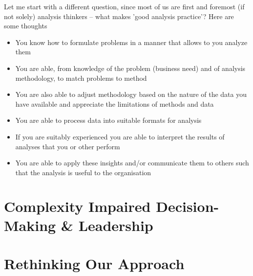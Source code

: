 
Let me start with a different question, since most of us are first and foremost (if not solely) analysis thinkers -- what makes 'good analysis practice'? Here are some thoughts
\begin{itemize}
	\item You know how to formulate problems in a manner that allows to you analyze them
	\item You are able, from knowledge of the problem (business need) and of analysis methodology, to match problems to method
	\item You are also able to adjust methodology based on the nature of the data you have available and appreciate the limitations of methods and data
	
	\item You are able to process data into suitable formats for analysis
	\item If you are suitably experienced you are able to interpret the results of analyses that you or other perform
	\item You are able to apply these insights and/or communicate them to others such that the analysis is useful to the organisation
\end{itemize}




\chapter{Complexity Impaired Decision-Making \& Leadership}




\chapter{Rethinking Our Approach}


